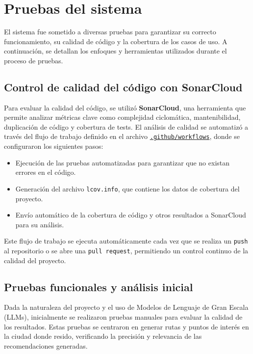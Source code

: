 \section{Pruebas del sistema}

El sistema fue sometido a diversas pruebas para garantizar su correcto funcionamiento, su calidad de código y la cobertura de los casos de uso. A continuación, se detallan los enfoques y herramientas utilizados durante el proceso de pruebas.

\subsection{Control de calidad del código con SonarCloud}

Para evaluar la calidad del código, se utilizó \textbf{SonarCloud}, una herramienta que permite analizar métricas clave como complejidad ciclomática, mantenibilidad, duplicación de código y cobertura de tests. El análisis de calidad se automatizó a través del flujo de trabajo definido en el archivo \href{https://github.com/fps1001/TFGII_FPisot/tree/main/.github/workflows}{\texttt{.github/workflows}}, donde se configuraron los siguientes pasos:
\begin{itemize}
	\item Ejecución de las pruebas automatizadas para garantizar que no existan errores en el código.
	\item Generación del archivo \texttt{lcov.info}, que contiene los datos de cobertura del proyecto.
	\item Envío automático de la cobertura de código y otros resultados a SonarCloud para su análisis.
\end{itemize}

Este flujo de trabajo se ejecuta automáticamente cada vez que se realiza un \texttt{push} al repositorio o se abre una \texttt{pull request}, permitiendo un control continuo de la calidad del proyecto.


\subsection{Pruebas funcionales y análisis inicial}

Dada la naturaleza del proyecto y el uso de Modelos de Lenguaje de Gran Escala (LLMs), inicialmente se realizaron pruebas manuales para evaluar la calidad de los resultados. Estas pruebas se centraron en generar rutas y puntos de interés en la ciudad donde resido, verificando la precisión y relevancia de las recomendaciones generadas.

